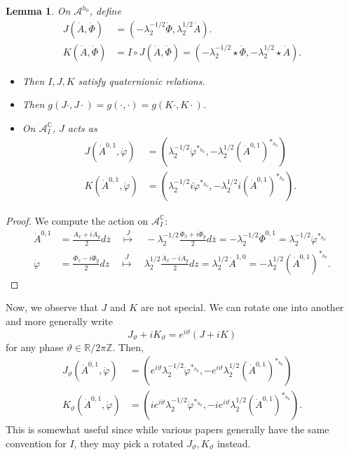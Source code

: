 \documentclass[12pt,letterpaper,reqno]{amsart}
\newtheorem{lem}[thm]{Lemma}
\theoremstyle{remark}
\theoremstyle{definition}
\numberwithin{thm}{section}
\numberwithin{equation}{section}
\numberwithin{figure}{section}
\newcommand{\R}{\ensuremath{\mathbb R}}
\newcommand{\C}{\ensuremath{\mathbb C}}
\newcommand{\Z}{\ensuremath{\mathbb Z}}
\newcommand{\zbar}{{\ensuremath{\overline{z}}}}
\begin{document}
\begin{lem}
On $\mathcal{A}^{h_0}$, define 
 \begin{align} J(\dot{A}, \dot{\Phi}) &= (- \lambda_2^{-1/2}\dot{\Phi},  \lambda_2^{1/2}\dot{A}). \nonumber \\
K(\dot{A}, \dot{\Phi}) &= I \circ J (\dot{A}, \dot{\Phi}) = ( -\lambda_2^{-1/2} \star \dot{\Phi},  -\lambda_2^{1/2} \star \dot{A}). \end{align}
 \begin{itemize}
\item Then $I,J,K$ satisfy quaternionic relations.
\item Then $g(J \cdot, J \cdot) =g(\cdot, \cdot)=g(K\cdot, K \cdot)$.
 \item On $\mathcal{A}_I^{\C}$, $J$ acts as 
 \begin{align*} J( \dot{A}^{0,1}, \dot \varphi) &= (\lambda_2^{-1/2} \dot{\varphi}^{*_{h_0}}, -\lambda_2^{1/2} (\dot{A}^{0,1})^{*_{h_0}})\\
   K( \dot{A}^{0,1}, \dot \varphi) &= (\lambda_2^{-1/2} i\dot{\varphi}^{*_{h_0}}, -\lambda_2^{1/2} i(\dot{A}^{0,1})^{*_{h_0}}).
  \end{align*}
 \end{itemize}
\end{lem}

\begin{proof}
We compute the action on $\mathcal{A}^{\C}_I$:
\begin{align}\dot{A}^{0,1} &= \frac{\dot{A}_x + i \dot{A}_y}{2} d \zbar  \quad \overset{J}{\mapsto}  \quad  - \lambda_2^{-1/2}\frac{\dot{\Phi}_x + i \dot{\Phi}_y }{2} d \zbar = - \lambda_2^{-1/2} \dot \Phi^{0,1} = \lambda_2^{-1/2} \dot \varphi^{*_{h_0}}  \nonumber \\  \dot \varphi&= \frac{\dot{\Phi}_x  - i \dot{\Phi}_y }{2} d z  \quad \overset{J}{\mapsto}  \quad   \lambda_2^{1/2}\frac{\dot{A}_x  - i \dot{A}_y }{2} d z=  \lambda_2^{1/2} \dot A^{1,0} =-\lambda_2^{1/2} (\dot{A}^{0,1})^{*_{h_0}}.   \end{align}
 \end{proof}
 



Now, we observe that $J$ and $K$ are not special. We can rotate one into another and more generally write
\[ J_{\vartheta} + i K_{\vartheta} = e^{i \vartheta}(J + i K) \]
for any phase $\vartheta \in \R/ 2 \pi \Z$.
Then, 
\begin{align}
J_{\vartheta} ( \dot{A}^{0,1}, \dot \varphi) &= (e^{i \vartheta} \lambda_2^{-1/2} \dot{\varphi}^{*_{h_0}}, -e^{i \vartheta} \lambda_2^{1/2} (\dot{A}^{0,1})^{*_{h_0}})\\ \nonumber 
K_{\vartheta} ( \dot{A}^{0,1}, \dot \varphi) &= (i e^{i \vartheta} \lambda_2^{-1/2} \dot{\varphi}^{*_{h_0}}, -i e^{i \vartheta} \lambda_2^{1/2} (\dot{A}^{0,1})^{*_{h_0}}).
\end{align}
This is somewhat useful since while various papers generally have the same convention for $I$, they may pick a rotated $J_\vartheta, K_\vartheta$ instead.
\end{document}
